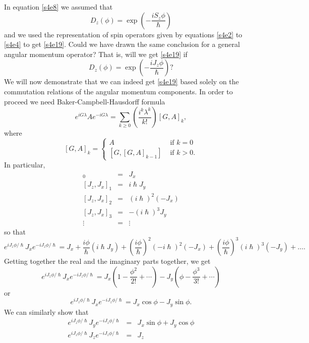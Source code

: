 \documentclass{article}
\numberwithin{equation}{section}
\theoremstyle{plain}
\numberwithin{thm}{section}
\theoremstyle{plain}
\numberwithin{prop}{section}
\theoremstyle{definition}
\numberwithin{defn}{section}
\theoremstyle{remark}
\begin{document}
In equation \eqref{s4e8} we assumed that 
\[
D_z(\phi) = \exp\left(-\frac{iS_z\phi}{\hslash}\right)
\]
and we used the representation of spin operators given by equations \eqref{s4e2}
to \eqref{s4e4} to get \eqref{s4e19}. Could we have drawn the same conclusion
for a general angular momentum operator? That is, will we get \eqref{s4e19}
if
\begin{equation}\label{s4e20}
D_z(\phi) = \exp\left(-\frac{iJ_z\phi}{\hslash}\right)?
\end{equation}
We will now demonstrate that we can indeed get \eqref{s4e19} based solely on
the commutation relations of the angular momentum components. In order to 
proceed we need Baker-Campbell-Hausdorff formula
\begin{equation}\label{s4e21}
e^{iG\lambda}Ae^{-iG\lambda} = 
\sum_{k \ge 0}\left(\frac{i^k\lambda^k}{k!}\right)[G, A]_k,
\end{equation}
where
\begin{equation}\label{s4e22}
[G, A]_k = \begin{cases}
A & \text{ if } k = 0 \\
[G, [G, A]_{k-1}] & \text{ if } k > 0.
\end{cases}
\end{equation}
In particular,
\begin{eqnarray}
[J_z, J_x]_0 &=& J_x \label{s4e23} \\
{}[J_z, J_x]_1 &=& i\hslash J_y \label{s4e24} \\
{}[J_z, J_x]_2 &=& (i\hslash)^2 (-J_x) \label{s4e25} \\
{}[J_z, J_x]_3 &=& -(i\hslash)^3 J_y \label{s4e26} \\
\vdots &=& \vdots \nonumber
\end{eqnarray}
so that
\[
e^{iJ_z\phi/\hslash}J_xe^{-iJ_z\phi/\hslash} = J_x + \frac{i\phi}{\hslash}
(i\hslash J_y) + \left(\frac{i\phi}{\hslash}\right)^2(-i\hslash)^2(-J_x)
+ \left(\frac{i\phi}{\hslash}\right)^3(i\hslash)^3(-J_y) + \ldots.
\]
Getting together the real and the imaginary parts together, we get
\[
e^{iJ_z\phi/\hslash}J_xe^{-iJ_z\phi/\hslash} = J_x\left(1 - \frac{\phi^2}{2!}
+ \cdots\right) - J_y\left(\phi - \frac{\phi^3}{3!} + \cdots\right)
\]
or
\begin{equation}\label{s4e27}
e^{iJ_z\phi/\hslash}J_xe^{-iJ_z\phi/\hslash} = J_x\cos\phi - J_y\sin\phi.
\end{equation}
We can similarly show that
\begin{eqnarray}
e^{iJ_z\phi/\hslash}J_ye^{-iJ_z\phi/\hslash} &=& J_x\sin\phi + J_y\cos\phi 
\label{s4e28} \\
e^{iJ_z\phi/\hslash}J_ze^{-iJ_z\phi/\hslash} &=& J_z \label{s4e29}
\end{eqnarray}
\end{document}
